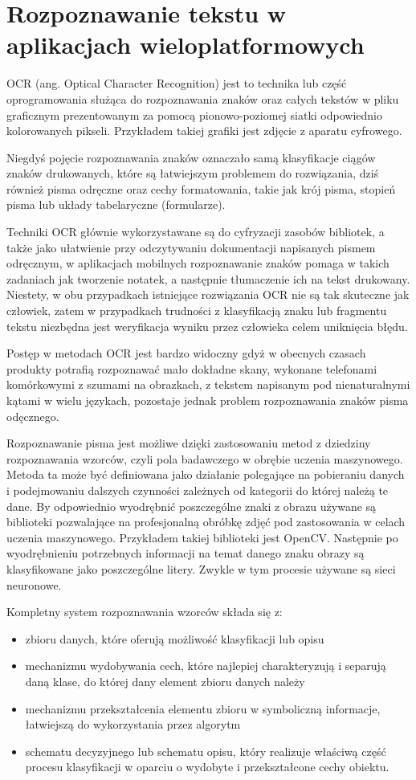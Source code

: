\documentclass[brudnopis]{xmgr}
\begin{document}
\chapter{Rozpoznawanie tekstu w aplikacjach wieloplatformowych}

OCR (ang. Optical Character Recognition) jest to technika lub część oprogramowania służąca do rozpoznawania znaków oraz całych tekstów w pliku graficznym prezentowanym za pomocą pionowo-poziomej siatki odpowiednio kolorowanych pikseli. Przykładem takiej grafiki jest zdjęcie z aparatu cyfrowego. 

Niegdyś pojęcie rozpoznawania znaków oznaczało samą klasyfikacje ciągów znaków drukowanych, które są łatwiejszym problemem do rozwiązania, dziś również pisma odręczne oraz cechy formatowania, takie jak krój pisma, stopień pisma lub układy tabelaryczne (formularze).

Techniki OCR głównie wykorzystawane są do cyfryzacji zasobów bibliotek, a także jako ułatwienie przy odczytywaniu dokumentacji napisanych pismem odręcznym, w aplikacjach mobilnych rozpoznawanie znaków pomaga w takich zadaniach jak tworzenie notatek, a następnie tłumaczenie ich na tekst drukowany. Niestety, w obu przypadkach istniejące rozwiązania OCR nie są tak skuteczne jak człowiek, zatem w przypadkach trudności z klasyfikacją znaku lub fragmentu tekstu niezbędna jest weryfikacja wyniku przez człowieka celem uniknięcia błędu.

Postęp w metodach OCR jest bardzo widoczny gdyż w obecnych czasach produkty potrafią rozpoznawać mało dokładne skany, wykonane telefonami komórkowymi z szumami na obrazkach, z tekstem napisanym pod nienaturalnymi kątami w wielu językach, pozostaje jednak problem rozpoznawania znaków pisma odęcznego.

Rozpoznawanie pisma jest możliwe dzięki zastosowaniu metod z dziedziny rozpoznawania wzorców, czyli pola badawczego w obrębie uczenia maszynowego. Metoda ta może być definiowana jako działanie polegające na pobieraniu danych i podejmowaniu dalszych czynności zależnych od kategorii do której należą te dane. By odpowiednio wyodrębnić poszczególne znaki z obrazu używane są biblioteki pozwalające na profesjonalną obróbkę zdjęć pod zastosowania w celach uczenia maszynowego. Przykładem takiej biblioteki jest OpenCV. Następnie po wyodrębnieniu potrzebnych informacji na temat danego znaku obrazy są klasyfikowane jako poszczególne litery. Zwykle w tym procesie używane są sieci neuronowe.

Kompletny system rozpoznawania wzorców składa się z:
\begin{itemize}
\item
zbioru danych, które oferują możliwość klasyfikacji lub opisu
\item
mechanizmu wydobywania cech, które najlepiej charakteryzują i separują daną klase, do której dany element zbioru danych należy
\item
mechanizmu przekształcenia elementu zbioru w symboliczną informacje, łatwiejszą do wykorzystania przez algorytm
\item
schematu decyzyjnego lub schematu opisu, który realizuje właściwą część procesu klasyfikacji w oparciu o wydobyte i przekształcone cechy obiektu.
\end{itemize}
\end{document}
